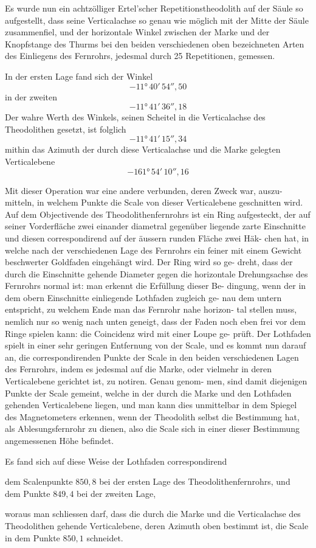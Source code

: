 \documentclass[12pt,a4paper]{article}
\begin{document}
Es wurde nun ein achtzölliger Ertel'scher Repetitionstheodolith auf der
Säule so aufgestellt, dass seine Verticalachse so genau wie möglich mit der Mitte
der Säule zusammenfiel, und der horizontale Winkel zwischen der Marke und
der Knopfstange des Thurms bei den beiden verschiedenen oben bezeichneten
Arten des Einliegens des Fernrohrs, jedesmal durch 25 Repetitionen, gemessen.

In der ersten Lage fand sich der Winkel
\[ -11°\,40'\,54''{,}50 \]
in der zweiten
\[ -11°\,41'\,36''{,}18 \]
Der wahre Werth des Winkels, seinen Scheitel in die Verticalachse des
Theodolithen gesetzt, ist folglich
\[ -11°\,41'\,15''{,}34 \]
mithin das Azimuth der durch diese Verticalachse und die Marke gelegten Verticalebene
\[ -161°\,54'\,10''{,}16 \]

Mit dieser Operation war eine andere verbunden, deren Zweck war, auszu-
mitteln, in welchem Punkte die Scale von dieser Verticalebene geschnitten wird.
Auf dem Objectivende des Theodolithenfernrohrs ist ein Ring aufgesteckt,
der auf seiner Vorderfläche zwei einander diametral gegenüber liegende zarte
Einschnitte und diesen correspondirend auf der äussern runden Fläche zwei Häk-
chen hat, in welche nach der verschiedenen Lage des Fernrohrs ein feiner mit
einem Gewicht beschwerter Goldfaden eingehängt wird. Der Ring wird so ge-
dreht, dass der durch die Einschnitte gehende Diameter gegen die horizontale
Drehungsachse des Fernrohrs normal ist: man erkennt die Erfüllung dieser Be-
dingung, wenn der in dem obern Einschnitte einliegende Lothfaden zugleich ge-
nau dem untern entspricht, zu welchem Ende man das Fernrohr nahe horizon-
tal stellen muss, nemlich nur so wenig nach unten geneigt, dass der Faden noch
eben frei vor dem Ringe spielen kann: die Coincidenz wird mit einer Loupe ge-
prüft. Der Lothfaden spielt in einer sehr geringen Entfernung von der Scale,
und es kommt nun darauf an, die correspondirenden Punkte der Scale in den
beiden verschiedenen Lagen des Fernrohrs, indem es jedesmal auf die Marke,
oder vielmehr in deren Verticalebene gerichtet ist, zu notiren. Genau genom-
men, sind damit diejenigen Punkte der Scale gemeint, welche in der durch die
Marke und den Lothfaden gehenden Verticalebene liegen, und man kann dies
unmittelbar in dem Spiegel des Magnetometers erkennen, wenn der Theodolith
selbst die Bestimmung hat, als Ablesungsfernrohr zu dienen, also die Scale sich
in einer dieser Bestimmung angemessenen Höhe befindet.

Es fand sich auf diese Weise der Lothfaden correspondirend
\begin{center}
dem Scalenpunkte $850{,}8$ bei der ersten Lage des Theodolithenfernrohrs, und\\
dem Punkte $849{,}4$ bei der zweiten Lage,
\end{center}
woraus man schliessen darf, dass die durch die Marke und die Verticalachse des
Theodolithen gehende Verticalebene, deren Azimuth oben bestimmt ist, die
Scale in dem Punkte $850{,}1$ schneidet.
\end{document}
